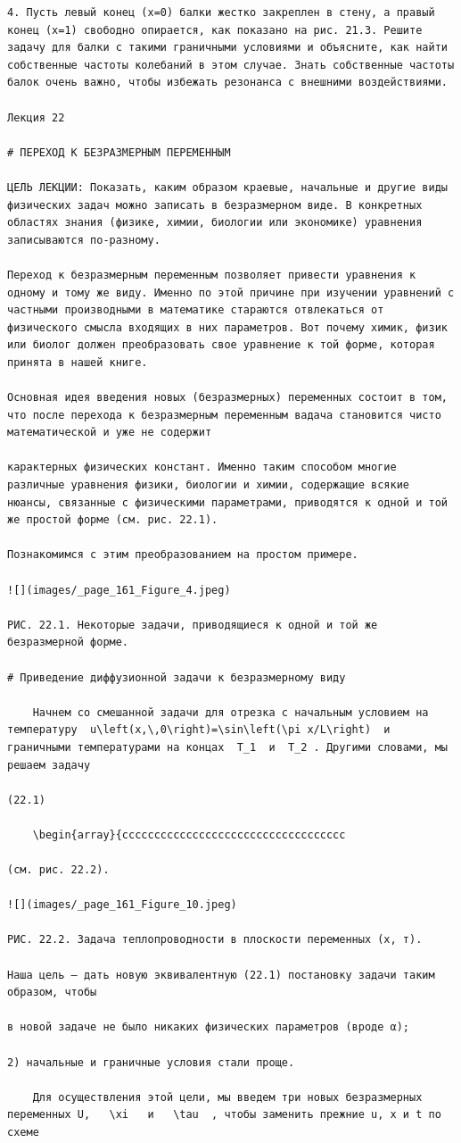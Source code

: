 \documentclass[
  ukrainian,
]{article}
\begin{document}
\begin{verbatim}
4. Пусть левый конец (x=0) балки жестко закреплен в стену, а правый конец (x=1) свободно опирается, как показано на рис. 21.3. Решите задачу для балки с такими граничными условиями и объясните, как найти собственные частоты колебаний в этом случае. Знать собственные частоты балок очень важно, чтобы избежать резонанса с внешними воздействиями.

Лекция 22

# ПЕРЕХОД К БЕЗРАЗМЕРНЫМ ПЕРЕМЕННЫМ

ЦЕЛЬ ЛЕКЦИИ: Показать, каким образом краевые, начальные и другие виды физических задач можно записать в безразмерном виде. В конкретных областях знания (физике, химии, биологии или экономике) уравнения записываются по-разному.

Переход к безразмерным переменным позволяет привести уравнения к одному и тому же виду. Именно по этой причине при изучении уравнений с частными производными в математике стараются отвлекаться от физического смысла входящих в них параметров. Вот почему химик, физик или биолог должен преобразовать свое уравнение к той форме, которая принята в нашей книге.

Основная идея введения новых (безразмерных) переменных состоит в том, что после перехода к безразмерным переменным вадача становится чисто математической и уже не содержит

карактерных физических констант. Именно таким способом многие различные уравнения физики, биологии и химии, содержащие всякие нюансы, связанные с физическими параметрами, приводятся к одной и той же простой форме (см. рис. 22.1).

Познакомимся с этим преобразованием на простом примере.

![](images/_page_161_Figure_4.jpeg)

РИС. 22.1. Некоторые задачи, приводящиеся к одной и той же безразмерной форме.

# Приведение диффузионной задачи к безразмерному виду

    Начнем со смешанной задачи для отрезка с начальным условием на температуру  u\left(x,\,0\right)=\sin\left(\pi x/L\right)  и граничными температурами на концах  T_1  и  T_2 . Другими словами, мы решаем задачу

(22.1)

    \begin{array}{ccccccccccccccccccccccccccccccccccc

(см. рис. 22.2).

![](images/_page_161_Figure_10.jpeg)

РИС. 22.2. Задача теплопроводности в плоскости переменных (х, т).

Наша цель — дать новую эквивалентную (22.1) постановку задачи таким образом, чтобы

в новой задаче не было никаких физических параметров (вроде α);

2) начальные и граничные условия стали проще.

    Для осуществления этой цели, мы введем три новых безразмерных переменных U,   \xi   и   \tau  , чтобы заменить прежние u, x и t по схеме
\end{verbatim}
\end{document}
